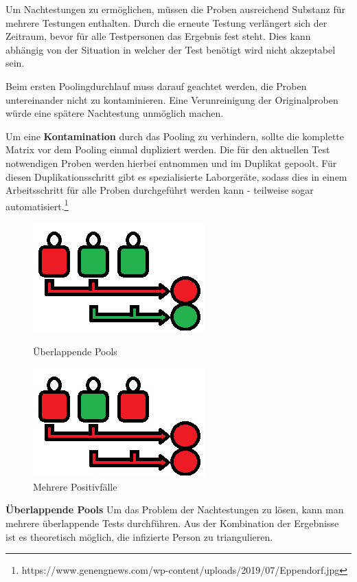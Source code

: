 Um Nachtestungen zu ermöglichen, müssen die Proben ausreichend Substanz für mehrere Testungen enthalten.
Durch die erneute Testung verlängert sich der Zeitraum, bevor für alle Testpersonen das Ergebnis fest steht.
Dies kann abhängig von der Situation in welcher der Test benötigt wird nicht akzeptabel sein.

\cleardoublepage
Beim ersten Poolingdurchlauf muss darauf geachtet werden, die Proben untereinander nicht zu kontaminieren.
Eine Verunreinigung der Originalproben würde eine spätere Nachtestung unmöglich machen.

Um eine \textbf{Kontamination} durch das Pooling zu verhindern, sollte die komplette Matrix vor dem Pooling einmal dupliziert werden. 
Die für den aktuellen Test notwendigen Proben werden hierbei entnommen und im Duplikat gepoolt.
Für diesen Duplikationsschritt gibt es spezialisierte Laborgeräte, sodass dies in einem Arbeitsschritt für alle Proben durchgeführt werden kann - teilweise sogar automatisiert.\footnote{https://www.genengnews.com/wp-content/uploads/2019/07/Eppendorf.jpg}

\begin{figure}
	\includegraphics[width=.4\textwidth]{img/KomplexePools}
	\caption{Überlappende Pools\footnotemark}

	\includegraphics[width=.4\textwidth]{img/MehrerePositiv}
	\caption{Mehrere Positivfälle\footnotemark}
\end{figure}

\textbf{Überlappende Pools}\newline
Um das Problem der Nachtestungen zu lösen, kann man mehrere überlappende Tests durchführen.
Aus der Kombination der Ergebnisse ist es theoretisch möglich, die infizierte Person zu triangulieren.

